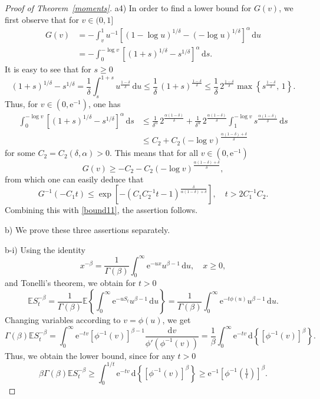 \documentclass{aptpub}
\newcommand\EE{\mathds E}
\newcommand\dup{\mathrm{d}}
\newcommand\eup{\mathrm{e}}                                %
\numberwithin{equation}{section}
\begin{document}
\begin{proof}[Proof of Theorem~\ref{moments}]
\medskip\noindent a4)
In order to find a lower bound for $G(v)$, we first observe that for $v\in(0,1]$
\begin{align*}
    G(v)
    &=-\int_v^1u^{-1}\left[(1-\log u)^{1/\delta} - (-\log u)^{1/\delta}\right]^{\alpha}\,\dup u\\
    &=-\int_0^{-\log v}\left[(1+s)^{1/\delta} - s^{1/\delta}\right]^{\alpha}\,\dup s.
\end{align*}
It is easy to see that for $s\geq0$
$$
    (1+s)^{1/\delta}-s^{1/\delta}
    = \frac1\delta\int_s^{1+s} u^{\frac{1-\delta}{\delta}}\,\dup u
    \leq \frac1\delta\,(1+s)^{\frac{1-\delta}{\delta}}
    \leq \frac1\delta\,2^{\frac{1-\delta}{\delta}} \max\left\{s^{\frac{1-\delta}{\delta}},\,1\right\}.
$$
Thus, for $v\in(0,\eup^{-1})$, one has
\begin{align*}
    \int_0^{-\log v}\left[(1+s)^{1/\delta} - s^{1/\delta} \right]^{\alpha}\,\dup s
    &\leq \frac{1}{\delta^\alpha}\,2^{\frac{\alpha(1-\delta)}{\delta}}+\frac{1}{\delta^\alpha}\,2^{\frac{\alpha(1-\delta)}{\delta}}\int_1^{-\log v}s^{\frac{\alpha(1-\delta)}{\delta}}\,\dup s\\
    &\leq C_2+C_2(-\log v)^{\frac{\alpha(1-\delta)+\delta}{\delta}}
\end{align*}
for some $C_2=C_2(\delta,\alpha)>0$. This means that for all $v\in(0,\eup^{-1})$
$$
    G(v)
    \geq -C_2-C_2(-\log v)^{\frac{\alpha(1-\delta)+\delta}{\delta}},
$$
from which one can easily deduce that
$$
    G^{-1}\left(-C_1t\right)
    \leq\exp\left[-\left(C_1C_2^{-1}t-1\right)^{\frac{\delta}{\alpha(1-\delta)+\delta}}\right],\quad t>2C_1^{-1}C_2.
$$
Combining this with \eqref{bound11}, the assertion follows.


\medskip\noindent b)
We prove these three assertions separately.

\medskip\noindent b-i)
Using the identity
\begin{equation}\label{laplace}
    x^{-\beta}
    = \frac{1}{\Gamma(\beta)}\int_0^\infty\eup^{-ux}u^{\beta-1}\,\dup u,
    \quad x\geq0,
\end{equation}
and Tonelli's theorem, we obtain for $t>0$
$$
    \EE S_t^{-\beta}
    = \frac{1}{\Gamma(\beta)} \EE\left\{\int_0^\infty\eup^{-uS_t}u^{\beta-1}\,\dup u\right\}
    = \frac{1}{\Gamma(\beta)} \int_0^\infty\eup^{-t\phi(u)}u^{\beta-1}\,\dup u.
$$
Changing variables according to $v=\phi(u)$, we get
\begin{equation}\label{inte}
    \Gamma(\beta)\EE S_t^{-\beta}
    =\int_0^\infty\eup^{-tv}\left[\phi^{-1}(v)\right]^{\beta-1} \frac{\dup v}{\phi'\left(\phi^{-1}(v)\right)}
    =\frac1\beta\int_0^\infty\eup^{-tv}\,\dup\left\{\left[\phi^{-1}(v)\right]^{\beta}\right\}.
\end{equation}
Thus, we obtain the lower bound, since for any $t>0$
$$
    \beta\Gamma(\beta)\EE S_t^{-\beta}
    \geq\int_0^{1/t} \eup^{-tv}\,\dup\left\{\left[\phi^{-1}(v)\right]^\beta\right\}
    \geq\eup^{-1}\left[\phi^{-1}\left(\tfrac{1}{t}\right)\right]^\beta.
$$


\end{proof}
\end{document}
